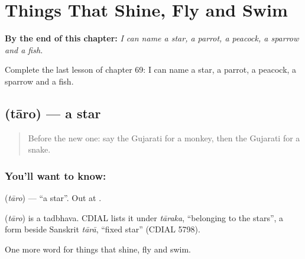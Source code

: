 
\chapter{Things That Shine, Fly and Swim}
\label{ch:gu-things-that-shine-fly-and-swim}

\begin{chapteropening}
\textbf{By the end of this chapter:} \emph{I can name a star, a parrot, a peacock, a sparrow and a fish.}

Complete the last lesson of chapter 69: I can name a star, a parrot, a peacock, a sparrow and a fish.
\end{chapteropening}

\section[\texorpdfstring{\gu{તારો} (tāro)}{તારો (tāro)}]{ (tāro) — a star}

\label{lesson:GU-C69-star}



\begin{quote}
Before the new one: say the Gujarati for a monkey, then the Gujarati for a snake.
\end{quote}

\subsection*{You'll want to know: }
\textbf{} (\emph{tāro}) — \textquotedblleft{}a star\textquotedblright{}. Out at \textbf{}.

\begin{cousinweb}
\textbf{} (\emph{tāro}) is a tadbhava. CDIAL lists it under \emph{tāraka}, \textquotedblleft{}belonging to the stars\textquotedblright{}, a form beside Sanskrit \emph{tārā}, \textquotedblleft{}fixed star\textquotedblright{} (CDIAL 5798).
\end{cousinweb}

\begin{grammarlens}[title={What you've built}]
One more word for things that shine, fly and swim.
\end{grammarlens}

